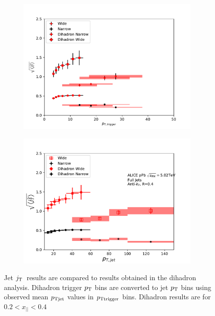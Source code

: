 \begin{figure}[htb]
\begin{subfigure}{0.5\textwidth}
\includegraphics[width=0.99\textwidth]{figures/summary/RMSWithSystematics_DihadronTriggerPt.pdf}
\end{subfigure}
\begin{subfigure}{0.5\textwidth}
\includegraphics[width=0.99\textwidth]{figures/summary/RMSWithSystematics_DihadronJetPt.pdf}
\end{subfigure}
\caption{Jet $j_{\rm T}$ results are compared to results obtained in the dihadron analysis. Dihadron trigger $p_{\rm T}$ bins are converted to jet $p_{\rm T}$  bins  using observed mean  $p_{\rm Tjet}$ values in $p_{\rm Ttrigger}$ bins. Dihadron results are for $0.2 < x_{||} < 0.4$}
\label{fig:dihadroncomparison}
\end{figure}

